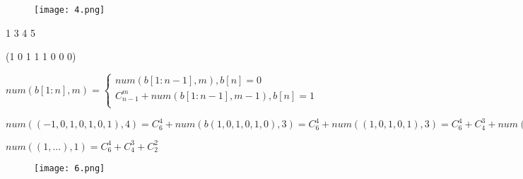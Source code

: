\begin{figure}[H]
    \centering
    \texttt{[image: 4.png]}
    
    
    \label{fig:4}
\end{figure}

1 3 4 5

(1 0 1 1 1 0 0 0)


$num(b[1:n], m) = \begin{cases}
    num(b[1:n-1], m), b[n] = 0\\
    C_{n-1}^m + num(b[1: n-1], m-1), b[n] = 1\\
\end{cases}$

$num((-1, 0, 1, 0, 1, 0, 1), 4) = C_6^4 + num(b(1,0,1,0,1,0), 3) = C_6^4 + num((1, 0, 1, 0, 1), 3) = C_6^4 + C_4^3 + num((1, 0, 1), 2) = C_4^4 + C_4^3 + C_2^2$



$num((1, ...), 1) = C_6^4 + C_4^3 + C_2^2$

\begin{figure}[H]
    \centering
    \texttt{[image: 6.png]}
    
    
    \label{fig:6}
\end{figure}




